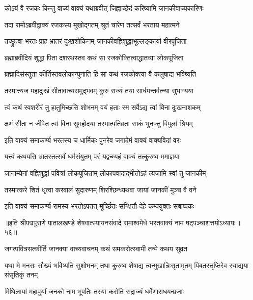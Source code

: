 \twolineshloka
{कोऽयं वै रजकः किन्तु वाच्यं वाक्यं यथाब्रवीत्}
{जिह्वाच्छेदं करिष्यामि जानकीवाच्यकारिणः}%

\twolineshloka
{तदा रामोऽब्रवीद्वाक्यं रजकस्य मुखोद्गतम्}
{श्रुतं चारेण तत्सर्वं भरताय महात्मने}%

\twolineshloka
{तच्छ्रुत्वा भरतः प्राह भ्रातरं दुःखशोकिनम्}
{जानकीवह्निशुद्धाभूल्लङ्कायां वीरपूजिता}%

\twolineshloka
{ब्रह्माब्रवीदियं शुद्धा पिता दशरथस्तव}
{कथं सा रजकोक्तित्वाद्धातव्या लोकपूजिता}%

\twolineshloka
{ब्रह्मादिसंस्तुता कीर्तिस्तवलोकान्पुनाति हि}
{सा कथं रजकोक्त्या वै कलुषाद्य भविष्यति}%

\twolineshloka
{तस्मात्त्यज महादुःखं सीतावाच्यसमुद्भवम्}
{कुरु राज्यं तया सार्धमन्तर्वत्न्या सुभाग्यया}%

\twolineshloka
{त्वं कथं स्वशरीरं तु हातुमिच्छसि शोभनम्}
{वयं हताः स्म सर्वेऽद्य त्वां विना दुःखनाशकम्}%

\twolineshloka
{क्षणं सीता न जीवेत त्वां विना सुमहोदया}
{तस्मात्पतिव्रता साकं भुनक्तु विपुलां श्रियम्}%

\twolineshloka
{इति वाक्यं समाकर्ण्य भरतस्य च धार्मिकः}
{पुनरेव जगादेमं वाक्यं वाक्यविदां वरः}%

\twolineshloka
{यत्त्वं कथयसि भ्रातस्तत्सर्वं धर्मसंयुतम्}
{परं यद्वच्म्यहं वाक्यं तत्कुरुष्व ममाज्ञया}%

\twolineshloka
{जानाम्येनां वह्निशुद्धां पवित्रां लोकपूजिताम्}
{लोकापवादाद्भीतोऽहं त्यजामि स्वां तु जानकीम्}%

\twolineshloka
{तस्मात्करे शितं धृत्वा करवालं सुदारुणम्}
{शिरश्छिन्ध्यथवा जायां जानकीं मुञ्च वै वने}%

\twolineshloka
{इति वाक्यं समाकर्ण्य रामस्य भरतोऽपतत्}
{मूर्च्छितः सन्क्षितौ देहे कम्पयुक्तः सबाष्पकः}%

{॥इति श्रीपद्मपुराणे पातालखण्डे शेषवात्स्यायनसंवादे रामाश्वमेधे भरतवाक्यं नाम षट्पञ्चाशत्तमोऽध्यायः॥५६॥}



\twolineshloka
{जगत्पवित्रसत्कीर्ति जानक्या वाच्यवाचनम्}
{कथं समकरोत्स्वामी तन्मे कथय सुव्रत}%


\threelineshloka
{यथा मे मनसः सौख्यं भविष्यति सुशोभनम्}
{तथा कुरुष्व शेषाद्य त्वन्मुखान्निःसृतामृतम्}
{पिबतस्तृप्तिरेव स्याद्यया संसृतिकृं तनम्}%


\twolineshloka
{मिथिलायां महापुर्यां जनको नाम भूपतिः}
{तस्यां करोति सद्राज्यं धर्मेणाराधयन्प्रजाः}%


